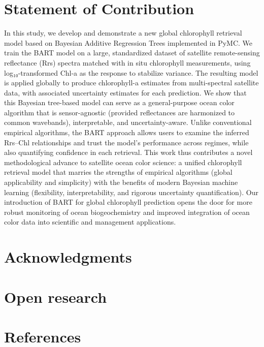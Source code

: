 \documentclass[
]{agujournal2019}
\begin{document}
\section{Statement of Contribution}\label{statement-of-contribution}

In this study, we develop and demonstrate a new global chlorophyll
retrieval model based on Bayesian Additive Regression Trees implemented
in PyMC. We train the BART model on a large, standardized dataset of
satellite remote-sensing reflectance (Rrs) spectra matched with in situ
chlorophyll measurements, using log₁₀-transformed Chl-a as the response
to stabilize variance. The resulting model is applied globally to
produce chlorophyll-a estimates from multi-spectral satellite data, with
associated uncertainty estimates for each prediction. We show that this
Bayesian tree-based model can serve as a general-purpose ocean color
algorithm that is sensor-agnostic (provided reflectances are harmonized
to common wavebands), interpretable, and uncertainty-aware. Unlike
conventional empirical algorithms, the BART approach allows users to
examine the inferred Rrs--Chl relationships and trust the model's
performance across regimes, while also quantifying confidence in each
retrieval. This work thus contributes a novel methodological advance to
satellite ocean color science: a unified chlorophyll retrieval model
that marries the strengths of empirical algorithms (global applicability
and simplicity) with the benefits of modern Bayesian machine learning
(flexibility, interpretability, and rigorous uncertainty
quantification). Our introduction of BART for global chlorophyll
prediction opens the door for more robust monitoring of ocean
biogeochemistry and improved integration of ocean color data into
scientific and management applications.

\section{Acknowledgments}\label{acknowledgments}

\section{Open research}\label{open-research}

\section*{References}\label{references}
\end{document}
